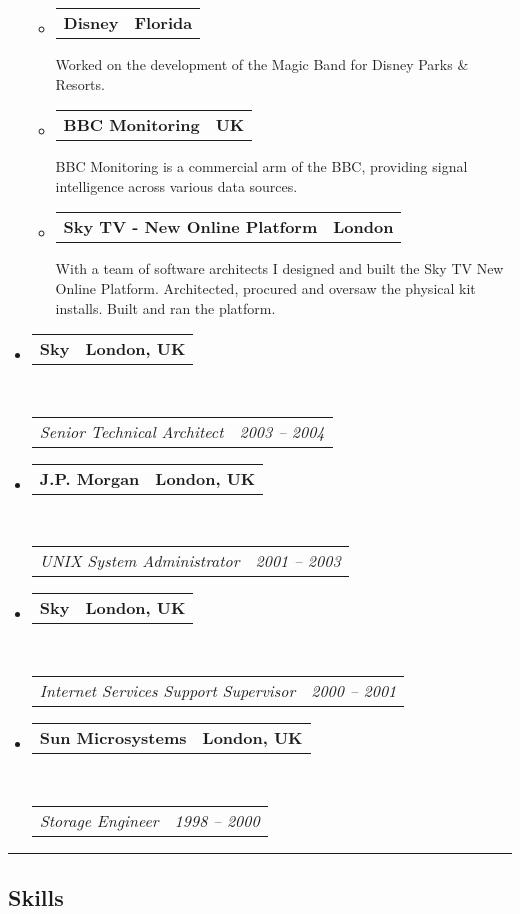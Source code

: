 \documentclass[10pt,a4paper]{article}
\makeatletter
\newcommand{\headerrow}[2]
{\begin{tabular*}{\linewidth}{l@{\extracolsep{\fill}}r}
	#1 &
	#2 \\
\end{tabular*}}
\makeatother
\begin{document}
\begin{itemize}
\begin{itemize}
					\item
          \headerrow
              {\textbf{Disney}}
              {\textbf{Florida}}
              Worked on the development of the Magic Band for Disney Parks \& Resorts.

					\item
          \headerrow
              {\textbf{BBC Monitoring}}
              {\textbf{UK}}
              BBC Monitoring is a commercial arm of the BBC, providing signal intelligence across various data sources.

				\item
				\headerrow
						{\textbf{Sky TV - New Online Platform}}
						{\textbf{London}}
						With a team of software architects I designed and built the Sky TV New Online Platform.  Architected, procured and oversaw the physical kit installs.  Built and ran the platform.

			\end{itemize}

	\item
	\headerrow
		{\textbf{Sky}}
		{\textbf{London, UK}}
	\\
	\headerrow
		{\emph{Senior Technical Architect}}
		{\emph{2003 -- 2004}}

	\item
	\headerrow
		{\textbf{J.P. Morgan}}
		{\textbf{London, UK}}
	\\
	\headerrow
		{\emph{UNIX System Administrator}}
		{\emph{2001 -- 2003}}

	\item
	\headerrow
		{\textbf{Sky}}
		{\textbf{London, UK}}
	\\
	\headerrow
		{\emph{Internet Services Support Supervisor}}
		{\emph{2000 -- 2001}}

	\item
	\headerrow
		{\textbf{Sun Microsystems}}
		{\textbf{London, UK}}
	\\
	\headerrow
		{\emph{Storage Engineer}}
		{\emph{1998 -- 2000}}
\end{itemize}


\hrule
\vspace{-0.4em}
\subsection*{Skills}
\end{document}
